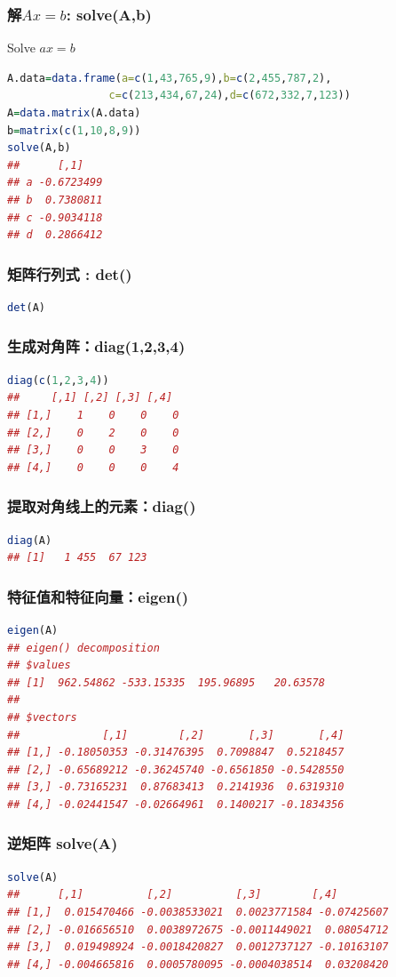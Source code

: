 \documentclass[11pt,a4paper]{article}
\begin{document}
\subsubsection{解$Ax=b$: solve(A,b)}
Solve $ax=b$
\begin{lstlisting}[language=R]
A.data=data.frame(a=c(1,43,765,9),b=c(2,455,787,2),
                c=c(213,434,67,24),d=c(672,332,7,123))
A=data.matrix(A.data)
b=matrix(c(1,10,8,9))
solve(A,b)
##      [,1]
## a -0.6723499
## b  0.7380811
## c -0.9034118
## d  0.2866412
\end{lstlisting}

\subsubsection{矩阵行列式 : det()}
\begin{lstlisting}[language=R]
det(A)
\end{lstlisting}
\subsubsection{生成对角阵：diag(1,2,3,4)}
\begin{lstlisting}[language=R]
diag(c(1,2,3,4))
##     [,1] [,2] [,3] [,4]
## [1,]    1    0    0    0
## [2,]    0    2    0    0
## [3,]    0    0    3    0
## [4,]    0    0    0    4
\end{lstlisting}
\subsubsection{提取对角线上的元素：diag()}
\begin{lstlisting}[language=R]
diag(A)
## [1]   1 455  67 123
\end{lstlisting}
\subsubsection{特征值和特征向量：eigen()}
\begin{lstlisting}[language=R]
eigen(A)
## eigen() decomposition
## $values
## [1]  962.54862 -533.15335  195.96895   20.63578
## 
## $vectors
##             [,1]        [,2]       [,3]       [,4]
## [1,] -0.18050353 -0.31476395  0.7098847  0.5218457
## [2,] -0.65689212 -0.36245740 -0.6561850 -0.5428550
## [3,] -0.73165231  0.87683413  0.2141936  0.6319310
## [4,] -0.02441547 -0.02664961  0.1400217 -0.1834356
\end{lstlisting}

\subsubsection{逆矩阵 solve(A)}
\begin{lstlisting}[language=R]
solve(A)
##      [,1]          [,2]          [,3]        [,4]
## [1,]  0.015470466 -0.0038533021  0.0023771584 -0.07425607
## [2,] -0.016656510  0.0038972675 -0.0011449021  0.08054712
## [3,]  0.019498924 -0.0018420827  0.0012737127 -0.10163107
## [4,] -0.004665816  0.0005780095 -0.0004038514  0.03208420
\end{lstlisting}
\end{document}
